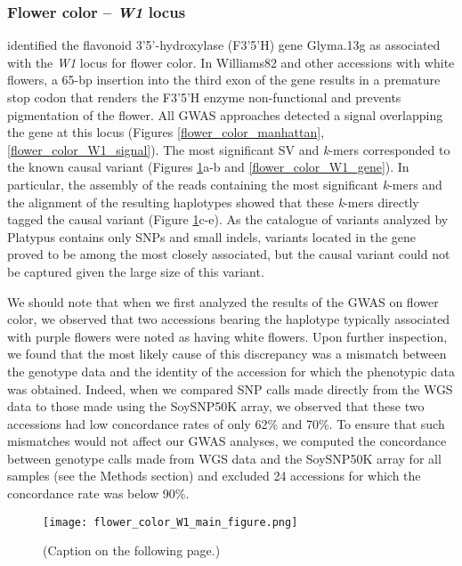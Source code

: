 \subsubsection*{Flower color -- \textit{W1} locus}
\label{sv-gwas-main-results-flower-color-l1}

\cite{zabala2007} identified the flavonoid 3’5’-hydroxylase (F3’5’H) gene
Glyma.13g as associated with the \textit{W1} locus for flower color. In
Williams82 and other accessions with white flowers, a 65-bp insertion into the
third exon of the gene results in a premature stop codon that renders the
F3’5’H enzyme non-functional and prevents pigmentation of the flower. All
GWAS approaches detected a signal overlapping the gene at this locus (Figures
\ref{flower_color_manhattan}, \ref{flower_color_W1_signal}). The most
significant SV and \textit{k}-mers corresponded to the known causal variant
(Figures \ref{flower-color-main-figure}a-b and \ref{flower_color_W1_gene}).
In particular, the assembly of the reads containing the most significant \textit{k}-mers
and the alignment of the resulting haplotypes showed that these \textit{k}-mers
directly tagged the causal variant (Figure \ref{flower-color-main-figure}c-e).
As the catalogue of variants analyzed by Platypus contains only SNPs and small
indels, variants located in the gene proved to be among the most closely
associated, but the causal variant could not be captured given the large size
of this variant.

We should note that when we first analyzed the results of the GWAS on flower
color, we observed that two accessions bearing the haplotype typically
associated with purple flowers were noted as having white flowers. Upon further
inspection, we found that the most likely cause of this discrepancy was a
mismatch between the genotype data and the identity of the accession for which
the phenotypic data was obtained. Indeed, when we compared SNP calls made
directly from the WGS data to those made using the SoySNP50K array, we observed
that these two accessions had low concordance rates of only 62\% and 70\%. To
ensure that such mismatches would not affect our GWAS analyses, we computed the
concordance between genotype calls made from WGS data and the SoySNP50K array
for all samples (see the Methods section) and
excluded 24 accessions for which the concordance rate was below 90\%.

\begin{figure}
	\centering
	\texttt{[image: flower\_color\_W1\_main\_figure.png]}
	\caption[Results of SV- and \textit{k}-mer-based GWAS at the
	\textit{W1} locus for flower color]{(Caption on the following page.)}
	\label{flower-color-main-figure}
\end{figure}

